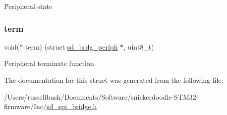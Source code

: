 Peripheral state \mbox{\label{structsd__brdg__periph_a3a401b0e690cda398c6ce64d867feda2}} 
\subsubsection{\texorpdfstring{term}{term}}
{\footnotesize\ttfamily void($\ast$ term) (struct \mbox{\hyperlink{structsd__brdg__periph}{sd\+\_\+brdg\+\_\+periph}} $\ast$, uint8\+\_\+t)}

Peripheral terminate function 

The documentation for this struct was generated from the following file\+:\begin{DoxyCompactItemize}
\item 
/\+Users/russellbush/\+Documents/\+Software/snickerdoodle-\/\+S\+T\+M32-\/firmware/\+Inc/\mbox{\hyperlink{sd__spi__bridge_8h}{sd\+\_\+spi\+\_\+bridge.\+h}}\end{DoxyCompactItemize}
